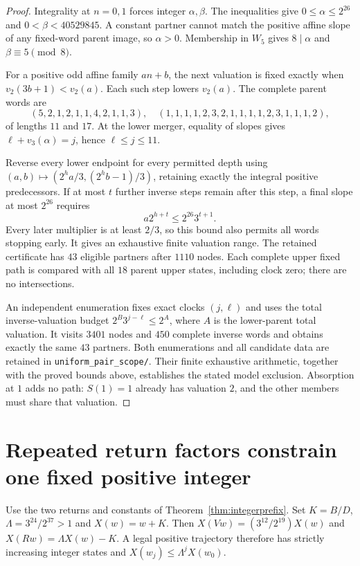 \documentclass[11pt]{article}
\begin{document}
\begin{proof}
Integrality at $n=0,1$ forces integer $\alpha,\beta$.
The inequalities give $0\le\alpha\le2^{26}$ and
$0<\beta<40529845$. A constant partner cannot match the positive
affine slope of any fixed-word parent image, so $\alpha>0$.
Membership in $W_5$ gives $8\mid\alpha$ and $\beta\equiv5\pmod8$.

For a positive odd affine family $an+b$, the next valuation is fixed
exactly when $v_2(3b+1)<v_2(a)$. Each such step lowers $v_2(a)$.
The complete parent words are
\[
 (5,2,1,2,1,1,4,2,1,1,3),\quad
 (1,1,1,1,2,3,2,1,1,1,1,2,3,1,1,1,2),
\]
of lengths $11$ and $17$. At the lower merger, equality of slopes gives
$\ell+v_3(\alpha)=j$, hence $\ell\le j\le11$.

Reverse every lower endpoint for every permitted depth using
$(a,b)\mapsto(2^ha/3,(2^hb-1)/3)$, retaining exactly the integral
positive predecessors. If at most $t$ further inverse steps remain after
this step, a final slope at most $2^{26}$ requires
\[
 a2^{h+t}\le2^{26}3^{t+1}.
\]
Every later multiplier is at least $2/3$, so this bound also permits
all words stopping early. It gives an exhaustive finite valuation range.
The retained certificate has $43$ eligible partners after $1110$ nodes.
Each complete upper fixed path is compared with all $18$ parent upper
states, including clock zero; there are no intersections.

An independent enumeration fixes exact clocks $(j,\ell)$ and uses
the total inverse-valuation budget $2^B3^{j-\ell}\le2^A$, where $A$
is the lower-parent total valuation. It visits $3401$ nodes and $450$
complete inverse words and obtains exactly the same $43$ partners.
Both enumerations and all candidate data are retained in
\texttt{uniform\_pair\_scope/}. Their finite exhaustive arithmetic,
together with the proved bounds above, establishes the stated model
exclusion. Absorption at $1$ adds no path: $S(1)=1$ already has
valuation $2$, and the other members must share that valuation.
\end{proof}

\section{Repeated return factors constrain one fixed positive integer}
Use the two returns and constants of Theorem~\ref{thm:integerprefix}.
Set $K=B/D$, $\Lambda=3^{24}/2^{37}>1$ and $X(w)=w+K$.
Then $X(Vw)=(3^{12}/2^{19})X(w)$ and
$X(Rw)=\Lambda X(w)-K$. A legal positive trajectory therefore has
strictly increasing integer states and
$X(w_j)\le\Lambda^jX(w_0)$.
\end{document}
